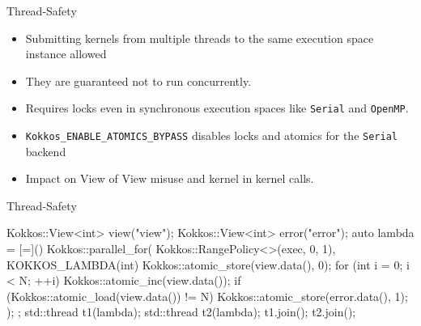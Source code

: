 
\begin{frame}[fragile]{Thread-Safety}
  \begin{itemize}
    \item Submitting kernels from multiple threads to the same execution space instance allowed
    \item They are guaranteed not to run concurrently. 
    \item Requires locks even in synchronous execution spaces like \texttt{Serial} and \texttt{OpenMP}.
    \item \texttt{Kokkos\_ENABLE\_ATOMICS\_BYPASS} disables locks and atomics for the \texttt{Serial} backend
    \item Impact on View of View misuse and kernel in kernel calls.
  \end{itemize}
\end{frame}

\begin{frame}[fragile]{Thread-Safety}
\begin{code}
  Kokkos::View<int> view("view");
  Kokkos::View<int> error("error");
  auto lambda = [=]() {
    Kokkos::parallel_for(
      Kokkos::RangePolicy<>(exec, 0, 1), KOKKOS_LAMBDA(int) {
          Kokkos::atomic_store(view.data(), 0);
          for (int i = 0; i < N; ++i) Kokkos::atomic_inc(view.data());
          if (Kokkos::atomic_load(view.data()) != N)
            Kokkos::atomic_store(error.data(), 1);
        });
  };
  std::thread t1(lambda);
  std::thread t2(lambda);
  t1.join();
  t2.join();
\end{code}
\end{frame}

